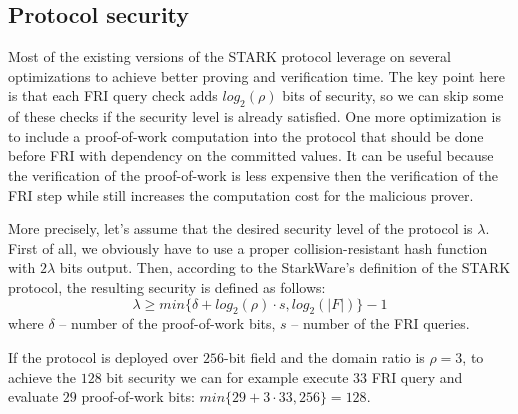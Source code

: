\documentclass[../lecture-notes.tex]{subfiles}
\begin{document}
\subsection{Protocol security}
Most of the existing versions of the STARK protocol leverage on several optimizations to achieve better proving and verification time. The key point here is that each FRI query check adds $log_2(\rho)$ bits of security, so we can skip some of these checks if the security level is already satisfied. 
One more optimization is to include a proof-of-work computation into the protocol that should be done before FRI with dependency on the committed values.
It can be useful because the verification of the proof-of-work is less expensive then the verification of the FRI step while still increases the computation cost for the malicious prover. 

More precisely, let's assume that the desired security level of the protocol is $\lambda$. First of all, we obviously have to use a proper collision-resistant hash function with $2\lambda$ bits output.
Then, according to the StarkWare's definition of the STARK protocol, the resulting security is defined as follows:
\begin{equation*}
    \lambda \geq min\{ \delta + log_2(\rho) \cdot s, log_2(|F|) \} - 1
\end{equation*}
where $\delta$ -- number of the proof-of-work bits, $s$ -- number of the FRI queries.

\begin{example}
If the protocol is deployed over $256$-bit field and the domain ratio is $\rho = 3$, to achieve the $128$ bit security we can for example execute $33$ FRI query and evaluate $29$ proof-of-work bits: $min\{29+3\cdot 33, 256\} = 128$. 
\end{example}
\end{document}
